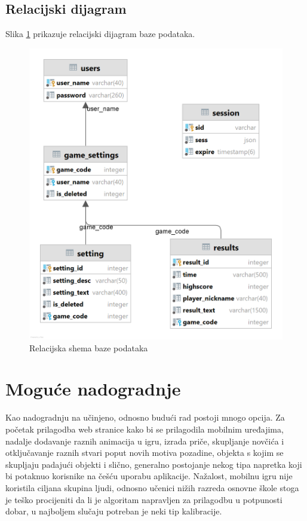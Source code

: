 \documentclass[times, utf8, zavrsni, numeric]{fer}
\begin{document}
	\newpage
	\section{Relacijski dijagram}
		Slika \ref{fig:relshema} prikazuje relacijski dijagram baze podataka.
		\begin{figure}[H]
			\includegraphics[width=\linewidth]{"slike/REL.png"} 
			\centering
			\caption{Relacijska shema baze podataka}
			\label{fig:relshema}
		\end{figure}


\chapter{Moguće nadogradnje}
Kao nadogradnju na učinjeno, odnosno budući rad postoji mnogo opcija. Za početak prilagodba web stranice kako bi se prilagodila mobilnim uređajima, nadalje dodavanje raznih animacija u igru, izrada priče, skupljanje novčića
i otključavanje raznih stvari poput novih motiva pozadine, objekta s kojim se skupljaju padajući objekti i slično, generalno postojanje nekog tipa napretka koji bi potaknuo korisnike na češću uporabu aplikacije.
Nažalost, mobilnu igru nije koristila ciljana skupina ljudi, odnosno učenici nižih razreda osnovne škole stoga je teško procijeniti da li je algoritam napravljen za prilagodbu u potpunosti dobar, u najboljem slučaju potreban
je neki tip kalibracije. 
\end{document}

